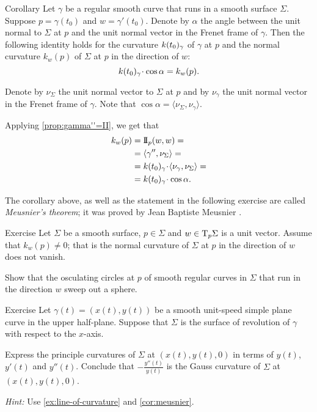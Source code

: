 \begin{thm}{Corollary}\label{cor:meusnier}
Let $\gamma$ be a regular smooth curve that runs in a smooth surface $\Sigma$.
Suppose $p=\gamma(t_0)$ and $w=\gamma'(t_0)$.
Denote by $\alpha$ the angle between the unit normal to $\Sigma$ at $p$ and the unit normal vector in the Frenet frame of $\gamma$.
Then the following identity holds for the curvature $k(t_0)_\gamma$ of $\gamma$ at $p$ and the normal curvature $k_w(p)$ of $\Sigma$ at $p$ in the direction of $w$:  
\[ \kur(t_0)_\gamma\cdot\cos\alpha=k_{w}(p).\]

\end{thm}


Denote by $\nu_\Sigma$ the unit normal vector to $\Sigma$ at $p$ 
and by $\nu_\gamma$ the unit normal vector in the Frenet frame of $\gamma$.
Note that $\cos\alpha=\langle\nu_\Sigma,\nu_\gamma\rangle$.

Applying \ref{prop:gamma''=II}, we get that
\begin{align*}
k_{w}(p)&=\II_p(w,w) =
\\
&=\langle\gamma'',\nu_\Sigma\rangle=
\\
&=\kur(t_0)_\gamma\cdot\langle\nu_\gamma,\nu_\Sigma\rangle=
\\
&=\kur(t_0)_\gamma\cdot\cos\alpha.
\end{align*}
\qedsf

The corollary above, as well as the statement in the following exercise are called \emph{Meusnier's theorem}; it was proved by Jean Baptiste Meusnier \cite{meusnier}.

\begin{thm}{Exercise}\label{ex:meusnier}
Let $\Sigma$ be a smooth surface, $p\in\Sigma$ and $w\in \mathrm{T}_p\Sigma$ is a unit vector.
Assume that $k_w(p)\ne 0$; that is the normal curvature of $\Sigma$ at $p$ in the direction of $w$ does not vanish.

Show that the osculating circles at $p$ of smooth regular curves in $\Sigma$ that run in the direction $w$ sweep out a sphere. 
\end{thm}

\begin{thm}{Exercise}\label{ex:principle-revolution}
Let $\gamma(t)=(x(t),y(t))$ be a smooth unit-speed simple plane curve in the upper half-plane.
Suppose that $\Sigma$ is the surface of revolution of $\gamma$ with respect to the $x$-axis.

Express the principle curvatures of $\Sigma$ at $(x(t),y(t),0)$ in terms of $y(t)$, $y'(t)$ and $y''(t)$.
Conclude that $-\tfrac{y''(t)}{y(t)}$ is the Gauss curvature of $\Sigma$ at $(x(t),y(t),0)$.
\end{thm}

\textit{Hint:} Use \ref{ex:line-of-curvature} and \ref{cor:meusnier}.



